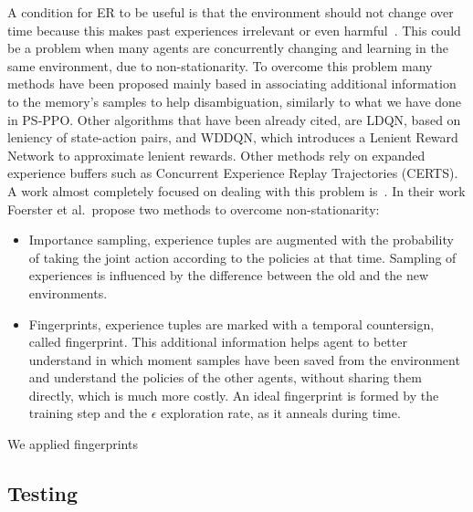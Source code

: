 \documentclass[11pt, a4paper, hidelinks]{report}
\begin{document}
A condition for ER to be useful is that the environment should not change over time because this makes past experiences irrelevant
or even harmful~\citep{Hernandez-Leal-2019}.
This could be a problem when many agents are concurrently changing and learning in the same environment, due to non-stationarity.
To overcome this problem many methods have been proposed mainly based in associating additional information to the memory's samples to help disambiguation, similarly to what we have done in PS-PPO\@.
Other algorithms that have been already cited, are LDQN, based on leniency of state-action pairs, and WDDQN, which introduces a Lenient Reward Network to approximate lenient rewards.
Other methods rely on expanded experience buffers such as Concurrent Experience Replay Trajectories (CERTS).
A work almost completely focused on dealing with this problem is~\citep{fingerprints}.
In their work Foerster et al.~propose two methods to overcome non-stationarity:
\begin{itemize}
	\item Importance sampling, experience tuples are augmented with the probability of taking the joint action according to the policies at that time.
Sampling of experiences is influenced by the difference between the old and the new environments.
	\item Fingerprints, experience tuples are marked with a temporal countersign, called fingerprint.
This additional information helps agent to better understand in which moment samples have been saved from the environment and understand the policies of the other agents, without sharing them directly, which is much more costly.
An ideal fingerprint is formed by the training step and the $\epsilon$ exploration rate, as it anneals during time.
\end{itemize}

We applied fingerprints %

\subsection{Testing}\label{subsec:testing2}
\end{document}
